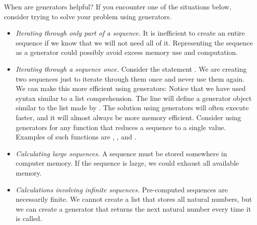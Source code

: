When are generators helpful?
If you encounter one of the situations below, consider trying to solve
your problem using generators.
\begin{itemize}
\item \emph{Iterating through only part of a sequence.}
It is inefficient to create an entire sequence if we know that we will not need all of it.
Representing the sequence as a generator could possibly avoid excess memory use and computation.
\item \emph{Iterating through a sequence once.} Consider the statement
.
We are creating two sequences just to iterate through them once and never use them again.
We can make this more efficient using generators:
Notice that we have used syntax similar to a list comprehension.
The line  will define a generator object similar to the list made by \li{[i for i in xrange(1000) if i\%2 == 0]}.
The solution using generators will often execute faster, and it will almost always be more memory efficient.  Consider using generators for any function that reduces a sequence to a single value.  Examples of such functions are , , and .
\item \emph{Calculating large sequences.}  A sequence must be stored somewhere in computer memory.
If the sequence is large, we could exhaust all available memory.
\item \emph{Calculations involving infinite sequences.}  Pre-computed sequences are necessarily finite.  We cannot create a list that stores all natural numbers, but we can create a generator that returns the next natural number every time it is called.
\end{itemize}

